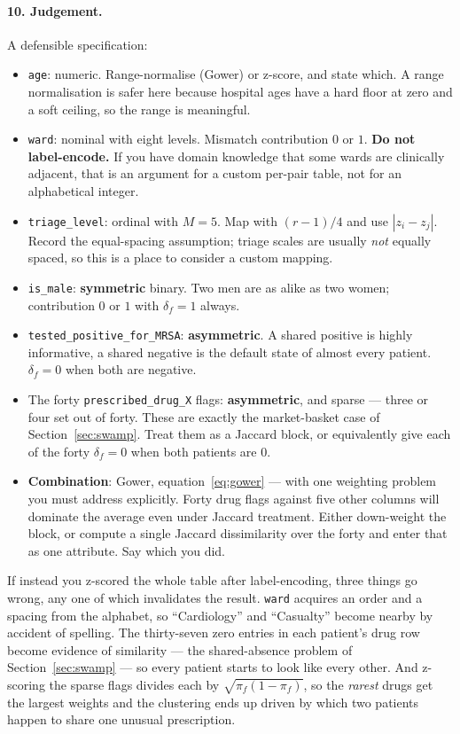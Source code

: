 \documentclass[11pt]{article}
\begin{document}
\paragraph{10. Judgement.}
A defensible specification:

\begin{itemize}[leftmargin=*]
  \item \texttt{age}: numeric. Range-normalise (Gower) or z-score, and state
    which. A range normalisation is safer here because hospital ages have a
    hard floor at zero and a soft ceiling, so the range is meaningful.
  \item \texttt{ward}: nominal with eight levels. Mismatch contribution
    $0$ or $1$. \textbf{Do not label-encode.} If you have domain knowledge
    that some wards are clinically adjacent, that is an argument for a
    custom per-pair table, not for an alphabetical integer.
  \item \texttt{triage\_level}: ordinal with $M = 5$. Map with
    $(r-1)/4$ and use $|z_i - z_j|$. Record the equal-spacing assumption;
    triage scales are usually \emph{not} equally spaced, so this is a place
    to consider a custom mapping.
  \item \texttt{is\_male}: \textbf{symmetric} binary. Two men are as alike as
    two women; contribution $0$ or $1$ with $\delta_f = 1$ always.
  \item \texttt{tested\_positive\_for\_MRSA}: \textbf{asymmetric}. A shared
    positive is highly informative, a shared negative is the default state of
    almost every patient. $\delta_f = 0$ when both are negative.
  \item The forty \texttt{prescribed\_drug\_X} flags: \textbf{asymmetric},
    and sparse --- three or four set out of forty. These are exactly the
    market-basket case of Section~\ref{sec:swamp}. Treat them as a Jaccard
    block, or equivalently give each of the forty $\delta_f = 0$ when both
    patients are $0$.
  \item \textbf{Combination}: Gower, equation~\eqref{eq:gower} --- with one
    weighting problem you must address explicitly. Forty drug flags against
    five other columns will dominate the average even under Jaccard
    treatment. Either down-weight the block, or compute a single Jaccard
    dissimilarity over the forty and enter that as one attribute. Say which
    you did.
\end{itemize}

If instead you z-scored the whole table after label-encoding, three things go
wrong, any one of which invalidates the result. \texttt{ward} acquires an
order and a spacing from the alphabet, so ``Cardiology'' and ``Casualty''
become nearby by accident of spelling. The thirty-seven zero entries in each
patient's drug row become evidence of similarity --- the shared-absence
problem of Section~\ref{sec:swamp} --- so every patient starts to look like
every other. And z-scoring the sparse flags divides each by
$\sqrt{\pi_f(1-\pi_f)}$, so the \emph{rarest} drugs get the largest weights
and the clustering ends up driven by which two patients happen to share one
unusual prescription.
\end{document}
